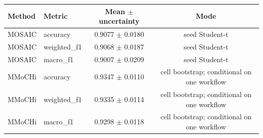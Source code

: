 \begin{tabular}{llcc}
\toprule
Method & Metric & Mean $\pm$ uncertainty & Mode \\
\midrule
MOSAIC & accuracy & 0.9077 $\pm$ 0.0180 & seed Student-t \\
MOSAIC & weighted\_f1 & 0.9068 $\pm$ 0.0187 & seed Student-t \\
MOSAIC & macro\_f1 & 0.9007 $\pm$ 0.0209 & seed Student-t \\
MMoCHi & accuracy & 0.9347 $\pm$ 0.0110 & cell bootstrap; conditional on one workflow \\
MMoCHi & weighted\_f1 & 0.9335 $\pm$ 0.0114 & cell bootstrap; conditional on one workflow \\
MMoCHi & macro\_f1 & 0.9298 $\pm$ 0.0118 & cell bootstrap; conditional on one workflow \\
\bottomrule
\end{tabular}
